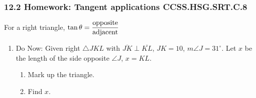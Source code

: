 

\fancyhead[LE]{\thepage}



\subsubsection*{12.2 Homework: Tangent applications \hfill CCSS.HSG.SRT.C.8}
For a right triangle, $\displaystyle \tan \theta = \frac{\rm{opposite}}{\rm{adjacent}}$
\begin{enumerate}
\item Do Now: Given right $\triangle JKL$ with $\overline{JK} \perp \overline{KL}$, $JK=10$, $m\angle J=31^\circ$. Let $x$ be the length of the side opposite $\angle J$, $x=KL$.
\begin{enumerate}
  \item Mark up the triangle.
  \item Find $x$.
\end{enumerate}
    \begin{flushright}
      \end{flushright}


\end{enumerate}
